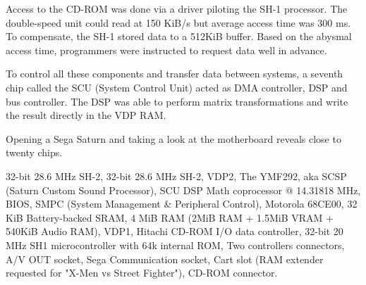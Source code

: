 \par
Access to the CD-ROM was done via a driver piloting the SH-1 processor. The double-speed unit could read at 150 KiB/s but average access time was 300 ms. To compensate, the SH-1 stored data to a 512KiB buffer. Based on the abysmal access time, programmers were instructed to request data well in advance.\\ 
\par
To control all these components and transfer data between systems, a seventh chip called the SCU (System Control Unit) acted as DMA controller, DSP and bus controller. The DSP was able to perform matrix transformations and write the result directly in the VDP RAM.\\
\par


\pagebreak





\par
Opening a Sega Saturn and taking a look at the motherboard reveals close to twenty chips.\\
\par
{} 32-bit 28.6 MHz SH-2, 
 32-bit 28.6 MHz SH-2, 
 VDP2, 
 The YMF292, aka SCSP (Saturn Custom Sound Processor), 
 SCU DSP Math coprocessor @ 14.31818 MHz, 
 BIOS, 
 SMPC (System Management \& Peripheral Control), 
 Motorola 68CE00, 
 32 KiB Battery-backed SRAM, 
 4 MiB RAM (2MiB RAM + 1.5MiB VRAM + 540KiB Audio RAM), 
 VDP1, 
 Hitachi CD-ROM I/O data controller, 
 32-bit 20 MHz SH1  microcontroller with 64k internal ROM, 
 Two controllers connectors, 
 A/V OUT socket,  
 Sega Communication socket,  
 Cart slot (RAM extender requested for "X-Men vs Street Fighter"), 
 CD-ROM connector.






